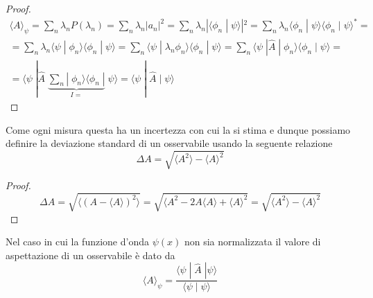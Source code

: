 \begin{proof}
\begin{equation*}
\begin{array}{l}
	\langle A\rangle_{\psi} = \sum_{n} \lambda_n P(\lambda_n) = \sum_{n} \lambda_n |a_n|^2 = \sum_{n} \lambda_n|\langle\phi_n \;|\; \psi \rangle|^2 = \sum_{n} \lambda_n \langle \phi_n \; |\; \psi \rangle \langle \phi_n \;|\; \psi \rangle^*= \\[0.5cm]
	= \sum_{n} \lambda_n \langle \psi \; |\; \phi_n \rangle \langle \phi_n \;|\; \psi \rangle = \sum_{n}  \langle \psi \; |\; \lambda_n \phi_n \rangle \langle \phi_n \;|\; \psi \rangle = \sum_{n} \langle \psi \;| \hat{A} \;|\; \phi_n \rangle \langle \phi_n \; | \; \psi \rangle = \\[0.5cm]
	=  \langle \psi \;| \hat{A} \;\underbrace{\sum_{n}|\; \phi_n \rangle \langle \phi_n \; |}_{I=} \; \psi \rangle = \langle \psi \;|\; \hat{A} \;|\; \psi \rangle 
\end{array}
\end{equation*}
\end{proof}
Come ogni misura questa ha un incertezza con cui la si stima e dunque possiamo definire la deviazione standard di un osservabile usando la seguente relazione 
\begin{equation}
	\Delta A = \sqrt{\langle A^2 \rangle - \langle A \rangle^2 }
\end{equation}

\begin{proof}
	\begin{equation*}
		\Delta A = \sqrt{\langle \left ( A- \langle A \rangle \right)^2 \rangle } = \sqrt{\langle A^2 - 2A \langle A \rangle  + \langle A \rangle^2} = \sqrt{\langle A^2 \rangle - \langle A \rangle^2 }
	\end{equation*}
\end{proof}

\noindent Nel caso in cui la funzione d'onda $\psi(x)$ non sia normalizzata il valore di aspettazione di un osservabile \`e dato da 
\begin{equation}
	\langle A \rangle_{\psi} = \frac{\langle \psi \;| \; \hat{A} \;| \psi \rangle}{\langle \psi \; | \; \psi \rangle}
\end{equation}

